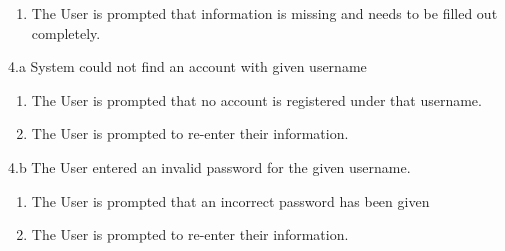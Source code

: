 \documentclass[10pt, draft]{article}
\begin{document}
\begin{usecase}
{\begin{enumerate}
		\item The User is prompted that information is missing and needs to be filled out completely.
	\end{enumerate}
	\item[4.a] System could not find an account with given username
	\begin{enumerate}
		\item The User is prompted that no account is registered under that username.
		\item The User is prompted to re-enter their information.
	\end{enumerate}
	\item[4.b] The User entered an invalid password for the given username.
	\begin{enumerate}
		\item The User is prompted that an incorrect password has been given
		\item The User is prompted to re-enter their information.
	\end{enumerate}
}
\end{usecase}
\end{document}
